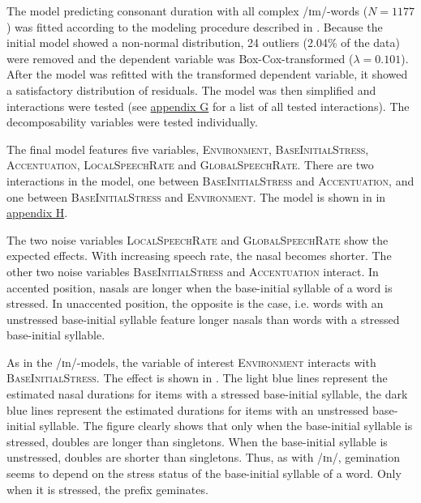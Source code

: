 The model predicting consonant duration with all complex /ɪm/-words ($N=1177$) was fitted according to the modeling procedure described in .
Because the initial model showed a non-normal distribution,  24 outliers (2.04\% of the data) were removed and the dependent variable was Box-Cox-transformed ($\lambda = 0.101$).  
After the model was refitted with the transformed dependent variable, it showed a satisfactory distribution of residuals. The model was then simplified and interactions were tested (see \hyperref[Appendix G Summaries of tested interactions in experimental study]{appendix G} for a list of all tested interactions). 
The decomposability variables were tested individually.



The final model features five variables, \textsc{Environment}, \textsc{BaseInitialStress}, \textsc{Accentuation}, \textsc{LocalSpeechRate} and \textsc{GlobalSpeechRate}. There are two interactions in the model, one between \textsc{BaseInitialStress} and \textsc{Accentuation}, and one between \textsc{BaseInitialStress} and \textsc{Environment}. The model is shown in  in \hyperref[Appendix H: Model Summaries Experiment]{appendix H}.

The two noise variables \textsc{LocalSpeechRate} and \textsc{GlobalSpeechRate} show the expected effects. With increasing speech rate, the nasal becomes shorter.
 The other two noise variables \textsc{BaseInitialStress} and \textsc{Accentuation} interact. In accented position, nasals are longer when the base-initial syllable of a word is stressed. In unaccented position, the opposite is the case, i.e. words with an unstressed base-initial syllable feature longer nasals than words with a stressed base-initial syllable. 
 


As in the /ɪn/-models, the variable of interest \textsc{Environment} interacts with \textsc{BaseInitialStress}. The effect is shown in . 
The light blue lines represent the estimated nasal durations for items with a stressed base-initial syllable, the dark blue lines represent  the estimated durations for items with an unstressed base-initial syllable.
The figure clearly shows that 
 only when the base-initial syllable is stressed, doubles are  longer than singletons. When the base-initial syllable is unstressed, doubles are shorter than singletons. 
Thus, as with /ɪn/, gemination seems to depend on the stress status of the base-initial syllable of a word. Only when it is stressed, the prefix  geminates.

